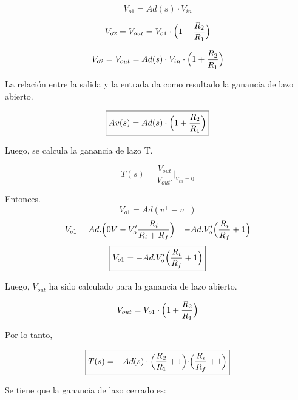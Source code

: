 \begin{equation}
    V_{o1} = Ad(s)\cdot V_{in} 
\end{equation}

\begin{equation}
     V_{o2} =V_{out}= V_{o1}\cdot \Bigl(1+\frac{R_2}{R_1}\Bigl)
\end{equation}

\begin{equation}
    V_{o2} =V_{out}= Ad(s) \cdot V_{in} \cdot \Bigl(1+\frac{R_2}{R_1}\Bigl)
\end{equation}

\hspace{1mm} La relación entre la salida y la entrada da como resultado la ganancia de lazo abierto.

\begin{equation}
    \boxed{
    Av(s) = Ad(s)\cdot \Bigl(1+\frac{R_2}{R_1}\Bigl)
    }
\end{equation}

\bigskip
\hspace{1mm} Luego, se calcula la ganancia de lazo T.

\bigskip
    \[T(s) = \frac{V_{out}}{V_{out'}}|_{V_{in}=0}\]

\hspace{1mm} Entonces.
\[V_{o1}= Ad(v^+-v^-)\]
\[V_{o1}= Ad.\Bigl(0V-V_{o}'\frac{R_i}{R_i+R_f}\Bigl)=-Ad.V_{o}'\Bigl(\frac{R_i}{R_f}+1\Bigl)\]
\begin{equation}\label{eq:primera_etapa} 
\boxed{V_{o1} = -Ad.V_{o}'\Bigl(\frac{R_i}{R_f}+1\Bigl)}
\end{equation}

\bigskip
\hspace{1mm} Luego, \(V_{out}\)  ha sido calculado para la ganancia de lazo abierto.

\begin{equation}
    V_{out}= V_{o1}\cdot \Bigl(1+\frac{R_2}{R_1}\Bigl)
\end{equation}

\hspace{1mm} Por lo tanto, 

\begin{equation}
    \boxed{
      T(s) = -Ad(s)\cdot \Bigl(\frac{R_2}{R_1}+1\Bigl)\cdot \Bigl(\frac{R_i}{R_f}+1\Bigl)
    }
\end{equation}
  
\bigskip
\hspace{1mm} Se tiene que la ganancia de lazo cerrado es:

